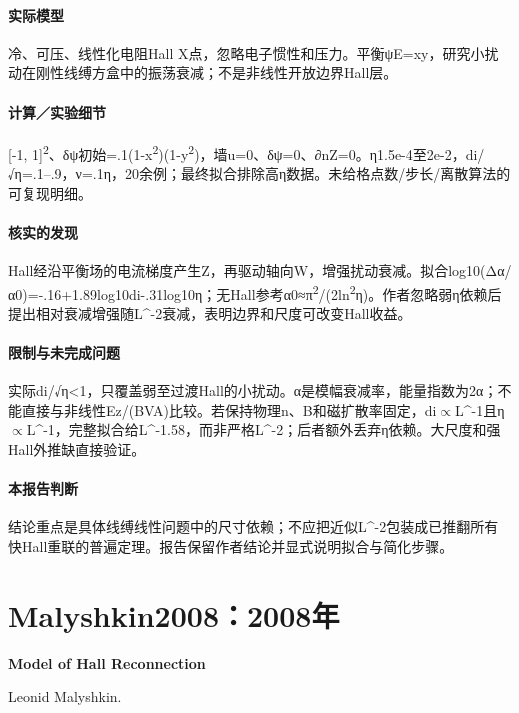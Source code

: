 \paragraph{实际模型}冷、可压、线性化电阻Hall X点，忽略电子惯性和压力。平衡ψE=xy，研究小扰动在刚性线缚方盒中的振荡衰减；不是非线性开放边界Hall层。

\paragraph{计算／实验细节}[-1, 1]\textsuperscript{2}、δψ初始=.1(1-x\textsuperscript{2})(1-y\textsuperscript{2})，墙u=0、δψ=0、∂nZ=0。η1.5e-4至2e-2，di/√η=.1–.9，ν=.1η，20余例；最终拟合排除高η数据。未给格点数/步长/离散算法的可复现明细。

\paragraph{核实的发现}Hall经沿平衡场的电流梯度产生Z，再驱动轴向W，增强扰动衰减。拟合log10(Δα/α0)=-.16+1.89log10di-.31log10η；无Hall参考α0≈π\textsuperscript{2}/(2ln\textsuperscript{2}η)。作者忽略弱η依赖后提出相对衰减增强随L\textasciicircum{}-2衰减，表明边界和尺度可改变Hall收益。

\paragraph{限制与未完成问题}实际di/√η<1，只覆盖弱至过渡Hall的小扰动。α是模幅衰减率，能量指数为2α；不能直接与非线性Ez/(BVA)比较。若保持物理n、B和磁扩散率固定，di\ensuremath{\propto}L\textasciicircum{}-1且η\ensuremath{\propto}L\textasciicircum{}-1，完整拟合给L\textasciicircum{}-1.58，而非严格L\textasciicircum{}-2；后者额外丢弃η依赖。大尺度和强Hall外推缺直接验证。

\paragraph{本报告判断}结论重点是具体线缚线性问题中的尺寸依赖；不应把近似L\textasciicircum{}-2包装成已推翻所有快Hall重联的普遍定理。报告保留作者结论并显式说明拟合与简化步骤。

\section{Malyshkin2008：2008年}\label{paper:Malyshkin2008}

\textbf{Model of Hall Reconnection}\citep{Malyshkin2008}\

Leonid Malyshkin.

